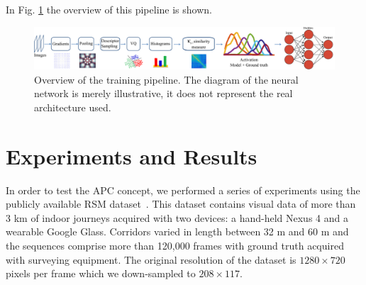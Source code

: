 In Fig. \ref{fig:pipeline} the overview of this pipeline is shown.


\begin{figure}[h]
\centering
\includegraphics[width=\linewidth]{gfx/Chapter05/nn_pipeline.pdf}
\caption{Overview of the training pipeline. The diagram of the neural network is merely illustrative, it does not represent the real architecture used.}
\label{fig:pipeline}
\end{figure}




\section{Experiments and Results}
\label{sec:experiments}

In order to test the APC concept, we performed a series of experiments using the publicly available RSM dataset~\cite{RiveraWearable}. This dataset contains visual data of more than 3 km of indoor journeys acquired with two devices: a hand-held Nexus 4 and a wearable Google Glass. Corridors varied in length between 32 m and 60 m and the sequences comprise more than 120,000 frames with ground truth acquired with surveying equipment. The original resolution of the dataset is $1280 \times 720$ pixels per frame which we down-sampled to $208 \times 117$. 



